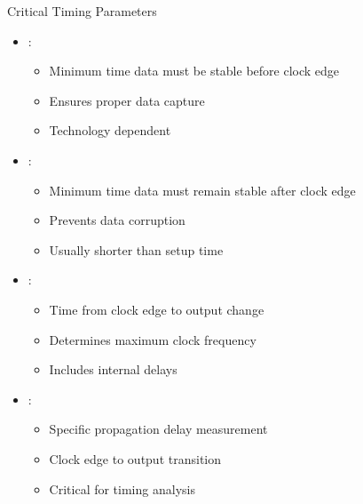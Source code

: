 \begin{frame}{Critical Timing Parameters}
\begin{itemize}
\item {}:
\begin{itemize}
\item Minimum time data must be stable before clock edge
\item Ensures proper data capture
\item Technology dependent
\end{itemize}
\vspace{0.3cm}
\item {}:
\begin{itemize}
\item Minimum time data must remain stable after clock edge
\item Prevents data corruption
\item Usually shorter than setup time
\end{itemize}
\vspace{0.3cm}
\item {}:
\begin{itemize}
\item Time from clock edge to output change
\item Determines maximum clock frequency
\item Includes internal delays
\end{itemize}
\vspace{0.3cm}
\item {}:
\begin{itemize}
\item Specific propagation delay measurement
\item Clock edge to output transition
\item Critical for timing analysis
\end{itemize}
\end{itemize}
\end{frame}

